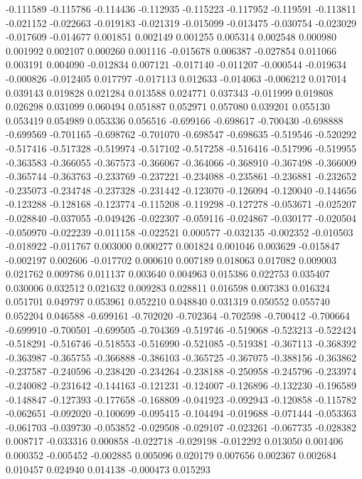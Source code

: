 -0.111589
-0.115786
-0.114436
-0.112935
-0.115223
-0.117952
-0.119591
-0.113811
-0.021152
-0.022663
-0.019183
-0.021319
-0.015099
-0.013475
-0.030754
-0.023029
-0.017609
-0.014677
0.001851
0.002149
0.001255
0.005314
0.002548
0.000980
0.001992
0.002107
0.000260
0.001116
-0.015678
0.006387
-0.027854
0.011066
0.003191
0.004090
-0.012834
0.007121
-0.017140
-0.011207
-0.000544
-0.019634
-0.000826
-0.012405
0.017797
-0.017113
0.012633
-0.014063
-0.006212
0.017014
0.039143
0.019828
0.021284
0.013588
0.024771
0.037343
-0.011999
0.019808
0.026298
0.031099
0.060494
0.051887
0.052971
0.057080
0.039201
0.055130
0.053419
0.054989
0.053336
0.056516
-0.699166
-0.698617
-0.700430
-0.698888
-0.699569
-0.701165
-0.698762
-0.701070
-0.698547
-0.698635
-0.519546
-0.520292
-0.517416
-0.517328
-0.519974
-0.517102
-0.517258
-0.516416
-0.517996
-0.519955
-0.363583
-0.366055
-0.367573
-0.366067
-0.364066
-0.368910
-0.367498
-0.366009
-0.365744
-0.363763
-0.233769
-0.237221
-0.234088
-0.235861
-0.236881
-0.232652
-0.235073
-0.234748
-0.237328
-0.231442
-0.123070
-0.126094
-0.120040
-0.144656
-0.123288
-0.128168
-0.123774
-0.115208
-0.119298
-0.127278
-0.053671
-0.025207
-0.028840
-0.037055
-0.049426
-0.022307
-0.059116
-0.024867
-0.030177
-0.020504
-0.050970
-0.022239
-0.011158
-0.022521
0.000577
-0.032135
-0.002352
-0.010503
-0.018922
-0.011767
0.003000
0.000277
0.001824
0.001046
0.003629
-0.015847
-0.002197
0.002606
-0.017702
0.000610
0.007189
0.018063
0.017082
0.009003
0.021762
0.009786
0.011137
0.003640
0.004963
0.015386
0.022753
0.035407
0.030006
0.032512
0.021632
0.009283
0.028811
0.016598
0.007383
0.016324
0.051701
0.049797
0.053961
0.052210
0.048840
0.031319
0.050552
0.055740
0.052204
0.046588
-0.699161
-0.702020
-0.702364
-0.702598
-0.700412
-0.700664
-0.699910
-0.700501
-0.699505
-0.704369
-0.519746
-0.519068
-0.523213
-0.522424
-0.518291
-0.516746
-0.518553
-0.516990
-0.521085
-0.519381
-0.367113
-0.368392
-0.363987
-0.365755
-0.366888
-0.386103
-0.365725
-0.367075
-0.388156
-0.363862
-0.237587
-0.240596
-0.238420
-0.234264
-0.238188
-0.250958
-0.245796
-0.233974
-0.240082
-0.231642
-0.144163
-0.121231
-0.124007
-0.126896
-0.132230
-0.196589
-0.148847
-0.127393
-0.177658
-0.168809
-0.041923
-0.092943
-0.120858
-0.115782
-0.062651
-0.092020
-0.100699
-0.095415
-0.104494
-0.019688
-0.071444
-0.053363
-0.061703
-0.039730
-0.053852
-0.029508
-0.029107
-0.023261
-0.067735
-0.028382
0.008717
-0.033316
0.000858
-0.022718
-0.029198
-0.012292
0.013050
0.001406
0.000352
-0.005452
-0.002885
0.005096
0.020179
0.007656
0.002367
0.002684
0.010457
0.024940
0.014138
-0.000473
0.015293
